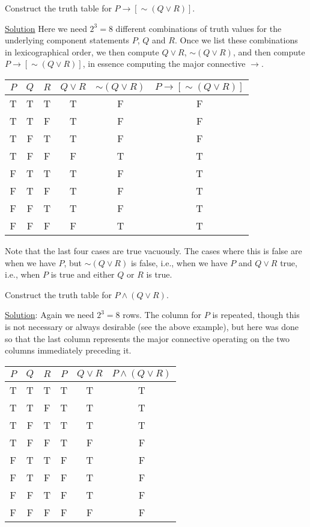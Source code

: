 \bex Construct the truth table for $P\longrightarrow[\sim (Q\vee R)]$.

\underline{Solution} Here we need $2^3=8$ different combinations
of truth values for the underlying component statements
$P$, $Q$ and $R$. Once we list these combinations in lexicographical
order, we then compute $Q\vee R$, $\sim(Q\vee R)$, and then compute
 $P\longrightarrow[\sim (Q\vee R)]$, in essence computing the major
connective $\longrightarrow$.
\begin{center}
\begin{tabular}{|c|c|c||c|c|c|}
\hline
$P$&$Q$&$R$&$Q\vee R$&$\sim(Q\vee R)$&$P\longrightarrow[\sim(Q\vee R)]$\\
\hline
T&T&T&T&F&F       \\
T&T&F&T&F&F       \\
T&F&T&T&F&F      \\
T&F&F&F&T&T       \\
\hline
F&T&T&T&F&T       \\
F&T&F&T&F&T        \\
F&F&T&T&F&T       \\
F&F&F&F&T&T       \\
\hline
\end{tabular}
\end{center}
Note that the last four cases are true vacuously.  The cases where
this is false are when we have $P$, but $\sim(Q\vee R)$ is false,
i.e., when we have $P$ and $Q\vee R$ true, i.e., when $P$ is
true and either $Q$ or $R$ is true.
\eex

\bex Construct the truth table for $P\wedge(Q\vee R)$.

\underline{Solution}: Again we need $2^3=8$ rows.  The column
for $P$ is repeated, though this is not necessary or always
desirable (see the above example), 
but here was done so that the last column represents
the major connective operating on the two columns immediately 
preceding it.

\begin{center}
\begin{tabular}{|c|c|c||c|c|c|}
\hline
$P$&$Q$&$R$&$P$&$Q\vee R$&$P\wedge(Q\vee R)$\\
\hline
T&T&T&T&T&T       \\
T&T&F&T&T&T       \\
T&F&T&T&T&T      \\
T&F&F&T&F&F       \\
\hline
F&T&T&F&T&F       \\
F&T&F&F&T&F        \\
F&F&T&F&T&F       \\
F&F&F&F&F&F       \\
\hline
\end{tabular}
\end{center}
\eex

